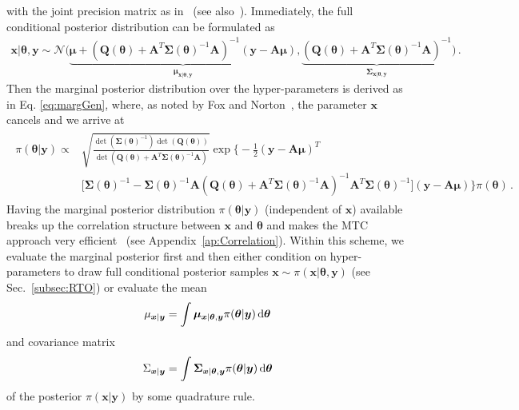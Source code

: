 with the joint precision matrix as in~\cite{SIMPSON201216} (see also~\cite{rue2005gaussian, fox2016fast}).
Immediately, the full conditional posterior distribution can be formulated as 
\begin{align}
	\bm{x} | \bm{\theta} , \bm{y}\sim \mathcal{N}\big(\underbrace{ \bm{\mu} + (\bm{Q}(\bm{\theta}) + \bm{A}^T \bm{\Sigma}(\bm{\theta})^{-1} \bm{A})^{-1}(\bm{y} - \bm{A}\bm{\mu})}_{\bm{\mu}_{\bm{x} | \bm{\theta} , \bm{y}}},\underbrace{ (\bm{Q}(\bm{\theta}) + \bm{A}^T \bm{\Sigma}(\bm{\theta})^{-1} \bm{A})^{-1}}_{\bm{\Sigma}_{\bm{x} | \bm{\theta} , \bm{y}}} \big)\, \label{eq:CondPostLin}.
\end{align}
Then the marginal posterior distribution over the hyper-parameters is derived as in Eq. \ref{eq:margGen}, where, as noted by Fox and Norton~\cite{fox2016fast}, the parameter $\bm{x}$ cancels and we arrive at
\begin{align}\begin{split}
		\pi(\bm{\theta} | \bm{y}) \propto & \sqrt{\frac{\det{(\bm{\Sigma}(\bm{\theta})^{-1})} \det{(\bm{Q}(\bm{\theta}))} }{\det{(\bm{Q}(\bm{\theta}) + \bm{A}^T \bm{\Sigma}(\bm{\theta})^{-1} \bm{A})} } }  \exp \Bigg\{  -\frac{1}{2} (\bm{y} - \bm{A} \bm{\mu})^T \\ &\big[ \bm{\Sigma}(\bm{\theta})^{-1} - \bm{\Sigma}(\bm{\theta})^{-1} \bm{A}  (\bm{Q}(\bm{\theta}) + \bm{A}^T \bm{\Sigma}(\bm{\theta})^{-1} \bm{A})^{-1} \bm{A}^T \bm{\Sigma} (\bm{\theta})^{-1} \big] (\bm{y} - \bm{A} \bm{\mu}) \Bigg\} \pi(\bm{\theta}) \, .
	\end{split} 
\end{align} 
Having the marginal posterior distribution $\pi (\bm{\theta}| \bm{y})$ (independent of $\bm{x}$) available breaks up the correlation structure between $\bm{x}$ and $\bm{\theta}$ and makes the MTC approach very efficient~\cite{fox2016fast} (see Appendix~\ref{ap:Correlation}).
Within this scheme, we evaluate the marginal posterior first and then either condition on hyper-parameters to draw full conditional posterior samples $\bm{x} \sim \pi (\bm{x} | \bm{\theta}, \bm{y})$ (see Sec.~\ref{subsec:RTO}) or evaluate the mean
\begin{align}
	\mu_{\bm{x}|\bm{y}} = \int \bm{\mu}_{\bm{x} | \bm{\theta} , \bm{y}} \pi(\bm{\theta}| \bm{y}) \mathop{}\!\mathrm{d} \bm{\theta} \label{eq:MeanGenInt}
\end{align} and covariance matrix
\begin{align}
	\Sigma_{\bm{x}|\bm{y}} = \int \bm{\Sigma}_{\bm{x} | \bm{\theta} , \bm{y}} \pi(\bm{\theta}| \bm{y}) \mathop{}\!\mathrm{d} \bm{\theta}\label{eq:CoVarGenInt}
\end{align}
of the posterior $\pi(\bm{x}| \bm{y})$ by some quadrature rule.

